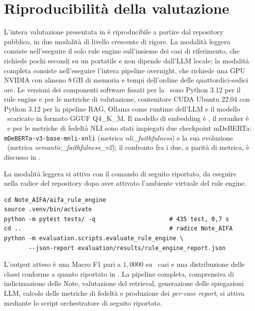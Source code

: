 \chapter{Riproducibilità della valutazione}
\label{app:riproducibilita}

L'intera valutazione presentata in  è riproducibile a partire dal repository pubblico, in due modalità di livello crescente di rigore. La modalità leggera consiste nell'eseguire il solo rule engine sull'insieme dei casi di riferimento, che richiede pochi secondi su un portatile e non dipende dall'LLM locale; la modalità completa consiste nell'eseguire l'intera pipeline overnight, che richiede una GPU NVIDIA con almeno 8\,GB di memoria e tempi dell'ordine delle quattordici-sedici ore. Le versioni dei componenti software fissati per la \cleanroomrun\ sono Python 3.12 per il rule engine e per le metriche di valutazione, contenitore CUDA Ubuntu 22.04 con Python 3.12 per la pipeline RAG, Ollama come runtime dell'LLM e il modello \llmmodel\ scaricato in formato GGUF Q4\_K\_M. Il modello di embedding è \embedmodel, il reranker è \reranker\ e per le metriche di fedeltà NLI sono stati impiegati due checkpoint mDeBERTa: \texttt{mDeBERTa-v3-base-mnli-xnli} (metrica \emph{nli\_faithfulness}) e la sua evoluzione \nlimodel\ (metrica \emph{semantic\_faithfulness\_v2}); il confronto fra i due, a parità di metrica, è discusso in .

La modalità leggera si attiva con il comando di seguito riportato, da eseguire nella radice del repository dopo aver attivato l'ambiente virtuale del rule engine.

\begin{verbatim}
cd Note_AIFA/aifa_rule_engine
source .venv/bin/activate
python -m pytest tests/ -q                     # 435 test, 0,7 s
cd ..                                          # radice Note_AIFA
python -m evaluation.scripts.evaluate_rule_engine \
       --json-report evaluation/results/rule_engine_report.json
\end{verbatim}

L'output atteso è una Macro F1 pari a $1{,}0000$ su \goldn\ casi e una distribuzione delle classi conforme a quanto riportato in . La pipeline completa, comprensiva di indicizzazione delle Note, valutazione del retrieval, generazione delle spiegazioni LLM, calcolo delle metriche di fedeltà e produzione dei \emph{per-case report}, si attiva mediante lo script orchestratore di seguito riportato.

